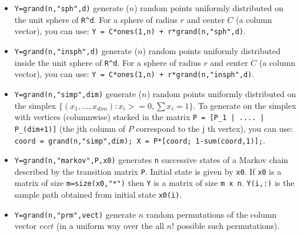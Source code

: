 \begin{description}
\begin{itemize}
\item {}
  \verb!Y=grand(n,"sph",d)! generate ($n$) random points uniformly
  distributed on the unit sphere of \verb!R^d!. For a sphere of radius
  $r$ and center $C$ (a column vector), you can use: 
  \verb!Y = C*ones(1,n) + r*grand(n,"sph",d)!.
  
\item {}
  \verb!Y=grand(n,"insph",d)! generate ($n$) random points uniformly
  distributed inside the unit sphere of \verb!R^d!. For a sphere of radius
  $r$ and center $C$ (a column vector), you can use: 
  \verb!Y = C*ones(1,n) + r*grand(n,"insph",d)!.
  
\item {}
  \verb!Y=grand(n,"simp",dim)! generate ($n$) random points uniformly
  distributed on the simplex $\{ (x_1,...,x_{dim}): x_i >=0, \sum
  x_i = 1 \}$. To generate on the simplex with vertices (columnwise) 
  stacked in the matrix \verb!P = [P_1 | .... | P_(dim+1)]! (the jth column of $P$ 
  correspond to the j th  vertex), you can use:
  \verb!coord = grand(n,"simp",dim); X = P*[coord; 1-sum(coord,1)];!.
 
\item {} 
  \verb!Y=grand(n,"markov",P,x0)! generates \verb!n! successive states of a Markov chain 
  described  by the transition matrix \verb!P!. Initial state is  given by 
  \verb!x0!. If \verb!x0! is a matrix of size \verb!m=size(x0,"*")! 
  then \verb!Y! is a matrix of size \verb!m x n!. \verb!Y(i,:)! is the sample 
  path  obtained from initial state \verb!x0(i)!.

\item {} \verb!Y=grand(n,"prm",vect)! generate $n$ random permutations of the
  column vector $vect$ (in a uniform way over the all $n!$ possible such
  permutations).

\end{itemize}

\end{description}


